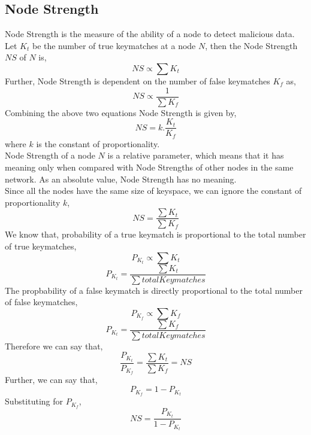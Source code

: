 \documentclass[journal]{IEEEtran}
\begin{document}
\subsection{Node Strength}
Node Strength is the measure of the ability of a node to detect malicious data.\\
Let $K_t$ be the number of true keymatches at a node $N$, then the Node Strength $NS$ of $N$ is,
\begin{equation}
NS\propto \sum K_t
\end{equation}
Further, Node Strength is dependent on the number of false keymatches $K_f$ as,
\begin{equation}
NS\propto \frac{1}{\sum K_f}
\end{equation}
Combining the above two equations Node Strength is given by,
\begin{equation}
NS=k.\frac{K_t}{K_f}
\end{equation}
where $k$ is the constant of proportionality.\\
Node Strength of a node $N$ is a relative parameter, which means that it has meaning only when compared with Node Strengths of other nodes in the same network. As an absolute value, Node Strength has no meaning.\\
Since all the nodes have the same size of keyspace, we can ignore the constant of proportionality $k$,
\begin{equation}
NS=\frac{\sum K_t}{\sum K_f}    
\end{equation}
We know that, probability of a true keymatch is proportional to the total number of true keymatches,
\begin{equation}
P_{K_t}\propto \sum K_t
\end{equation}
\begin{equation}
P_{K_t}=\frac{\sum K_t}{\sum totalKeymatches}
\end{equation}
The propbability of a false keymatch is directly proportional to the total number of false keymatches,
\begin{equation}
P_{K_f} \propto \sum K_f
\end{equation}
\begin{equation}
P_{K_t}=\frac{\sum K_f}{\sum totalKeymatches}
\end{equation}
Therefore we can say that,
\begin{equation}
\frac{P_{K_t}}{P_{K_f}}=\frac{\sum K_t}{\sum K_f}=NS
\end{equation}
Further, we can say that,
\begin{equation}
P_{K_f} = 1-P_{K_t}
\end{equation}
Substituting for $P_{K_f}$,
\begin{equation}
NS=\frac{P_{K_t}}{1-P_{K_t}}
\end{equation}
\end{document}
